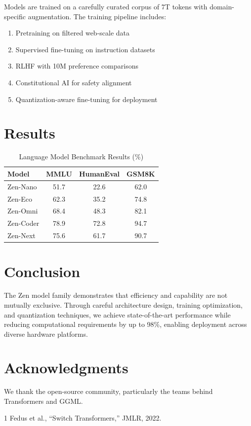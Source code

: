 \documentclass[conference]{IEEEtran}
\begin{document}
Models are trained on a carefully curated corpus of 7T tokens with domain-specific augmentation. The training pipeline includes:

\begin{enumerate}
    \item Pretraining on filtered web-scale data
    \item Supervised fine-tuning on instruction datasets
    \item RLHF with 10M preference comparisons
    \item Constitutional AI for safety alignment
    \item Quantization-aware fine-tuning for deployment
\end{enumerate}

\section{Results}

\begin{table}[H]
\centering
\begin{tabular}{lccc}
\toprule
\textbf{Model} & \textbf{MMLU} & \textbf{HumanEval} & \textbf{GSM8K} \\
\midrule
Zen-Nano & 51.7 & 22.6 & 62.0 \\
Zen-Eco & 62.3 & 35.2 & 74.8 \\
Zen-Omni & 68.4 & 48.3 & 82.1 \\
Zen-Coder & 78.9 & 72.8 & 94.7 \\
Zen-Next & 75.6 & 61.7 & 90.7 \\
\bottomrule
\end{tabular}
\caption{Language Model Benchmark Results (\%)}
\end{table}

\section{Conclusion}

The Zen model family demonstrates that efficiency and capability are not mutually exclusive. Through careful architecture design, training optimization, and quantization techniques, we achieve state-of-the-art performance while reducing computational requirements by up to 98\%, enabling deployment across diverse hardware platforms.

\section*{Acknowledgments}

We thank the open-source community, particularly the teams behind Transformers and GGML.

\begin{thebibliography}{1}
 Fedus et al., ``Switch Transformers,'' JMLR, 2022.
\end{thebibliography}
\end{document}
